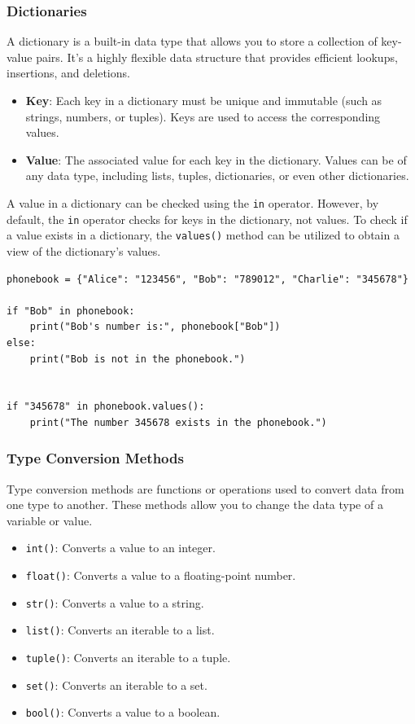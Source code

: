 \subsubsection{Dictionaries}
A dictionary is a built-in data type that allows you to store a collection of key-value pairs. It's a highly flexible data structure that provides efficient lookups, insertions, and deletions.

\begin{itemize}
    \item \textbf{Key}: Each key in a dictionary must be unique and immutable (such as strings, numbers, or tuples). Keys are used to access the corresponding values.
    \item \textbf{Value}: The associated value for each key in the dictionary. Values can be of any data type, including lists, tuples, dictionaries, or even other dictionaries.
\end{itemize}

A value in a dictionary can be checked using the \texttt{in} operator. However, by default, the \texttt{in} operator checks for keys in the dictionary, not values. To check if a value exists in a dictionary, the \texttt{values()} method can be utilized to obtain a view of the dictionary's values.

\begin{codebox}
\begin{verbatim}
phonebook = {"Alice": "123456", "Bob": "789012", "Charlie": "345678"}

if "Bob" in phonebook:
    print("Bob's number is:", phonebook["Bob"])
else:
    print("Bob is not in the phonebook.")


if "345678" in phonebook.values():
    print("The number 345678 exists in the phonebook.")
\end{verbatim}
\end{codebox}

\newpage
\subsubsection{Type Conversion Methods}

Type conversion methods are functions or operations used to convert data from one type to another. These methods allow you to change the data type of a variable or value.

\begin{itemize}
    \item \texttt{int()}: Converts a value to an integer.
    \item \texttt{float()}: Converts a value to a floating-point number.
    \item \texttt{str()}: Converts a value to a string.
    \item \texttt{list()}: Converts an iterable to a list.
    \item \texttt{tuple()}: Converts an iterable to a tuple.
    \item \texttt{set()}: Converts an iterable to a set.
    \item \texttt{bool()}: Converts a value to a boolean.
\end{itemize}

